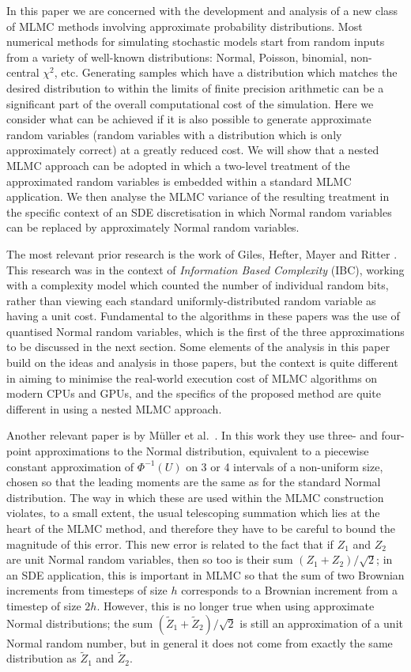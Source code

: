 \documentclass[review]{siamart190516}
\def \tZ {{\widetilde{Z}}}
\begin{document}
In this paper we are concerned with the development and analysis of a new
class of MLMC methods involving approximate probability distributions.
Most numerical methods for simulating stochastic models start from random
inputs from a variety of well-known distributions: Normal, Poisson, binomial,
non-central $\chi^2$, etc.  Generating samples which have a distribution
which matches the desired distribution to within the limits of finite precision
arithmetic can be a significant part of the overall computational cost of
the simulation.
Here we consider what can be achieved if it is also possible to generate
approximate random variables (random variables with a distribution
which is only approximately correct) at a greatly reduced cost.
We will show that a nested MLMC approach can be adopted in which a two-level
treatment of the approximated random variables is embedded within a standard
MLMC application. We then analyse the MLMC variance of the resulting treatment
in the specific context of an SDE discretisation in which Normal random variables
can be replaced by approximately Normal random variables.

The most relevant prior research is the work of Giles, Hefter, Mayer and Ritter
\cite{ghmr19,ghmr19b}.  
This research was in the context of \emph{Information Based Complexity} (IBC), 
working with a complexity model which counted the number of
individual random bits, rather than viewing each standard
uniformly-distributed random
variable as having a unit cost.  Fundamental to the algorithms in these papers
was the use of quantised Normal random variables, which is the first of the
three approximations to be discussed in the next section.  Some elements of the
analysis in this paper build on the ideas and analysis in those papers, but
the context is quite different in aiming to minimise the real-world execution
cost of MLMC algorithms on modern CPUs and GPUs, and the specifics of the
proposed method are quite different in using a nested MLMC approach.

Another relevant paper is by M\"uller et al.~\cite{mss15}.
In this work they use three- and four-point approximations to the Normal
distribution, equivalent to a piecewise constant approximation of $\Phi^{-1}(U)$
on 3 or 4 intervals of a non-uniform size, chosen so that the leading moments
are the same as for the standard Normal distribution.  The way in which these
are used within the MLMC construction violates, to a small extent, the usual
telescoping summation which lies at the heart of the MLMC method, and therefore
they have to be careful to bound the magnitude of this error. This new error is
related to the fact that if $Z_1$ and $Z_2$ are unit Normal random variables,
then so too is their sum $(Z_1{+}Z_2)/\sqrt{2}$; in an SDE application, this
is important in MLMC so that the sum of two Brownian increments from timesteps
of size $h$ corresponds to a Brownian increment from a timestep of size $2h$.
However, this is no longer true when using approximate Normal distributions;
the sum $(\tZ_1{+}\tZ_2)/\sqrt{2}$ is still an approximation of a unit Normal
random number, but in general it does not come from exactly the same distribution
as $\tZ_1$ and $\tZ_2$.
\end{document}
